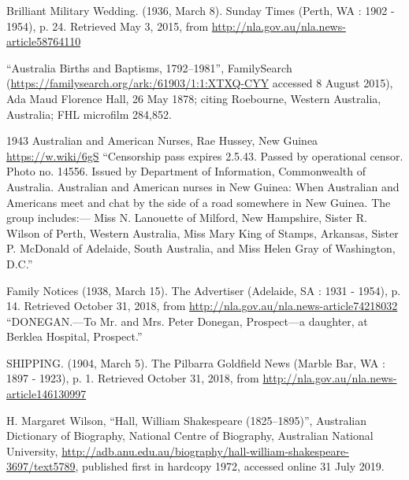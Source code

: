 \begin{thebibliography}{999}
	Brilliant Military Wedding. (1936, March 8). Sunday Times (Perth, WA : 1902 - 1954), p. 24.
	Retrieved May 3, 2015, from \url{http://nla.gov.au/nla.news-article58764110}

	``Australia Births and Baptisms, 1792--1981'', FamilySearch
	(\url{https://familysearch.org/ark:/61903/1:1:XTXQ-CYY} accessed 8 August 2015),
	Ada Maud Florence Hall, 26 May 1878; citing Roebourne, Western Australia, Australia;
	FHL microfilm 284,852.

    1943 Australian and American Nurses, Rae Hussey, New Guinea \url{https://w.wiki/6gS}
    ``Censorship pass expires 2.5.43. Passed by operational censor. Photo no. 14556.
    Issued by Department of Information, Commonwealth of Australia. Australian and American nurses in New Guinea:
    When Australian and Americans meet and chat by the side of a road somewhere in New Guinea. The group includes:---
    Miss N. Lanouette of Milford, New Hampshire, Sister R. Wilson of Perth, Western Australia,
    Miss Mary King of Stamps, Arkansas, Sister P. McDonald of Adelaide, South Australia,
    and Miss Helen Gray of Washington, D.C.''

    Family Notices (1938, March 15). The Advertiser (Adelaide, SA : 1931 - 1954), p. 14.
    Retrieved October 31, 2018, from \url{http://nla.gov.au/nla.news-article74218032}
    ``DONEGAN.---To Mr. and Mrs. Peter Donegan, Prospect---a daughter, at Berklea Hospital, Prospect.''

    SHIPPING. (1904, March 5). The Pilbarra Goldfield News (Marble Bar, WA : 1897 - 1923), p. 1.
    Retrieved October 31, 2018, from \url{http://nla.gov.au/nla.news-article146130997}

	H. Margaret Wilson, ``Hall, William Shakespeare (1825--1895)'',
	Australian Dictionary of Biography, National Centre of Biography, Australian National University,
	\url{http://adb.anu.edu.au/biography/hall-william-shakespeare-3697/text5789},
	published first in hardcopy 1972, accessed online 31 July 2019.

\end{thebibliography}
